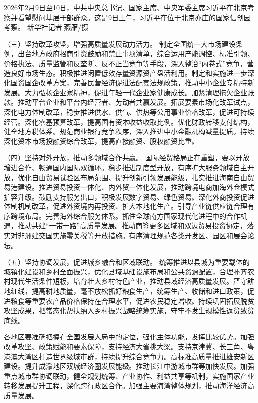 \documentclass[UTF8,zihao=-4]{ctexart}
\begin{document}
2026年2月9日至10日，中共中央总书记、国家主席、中央军委主席习近平在北京考察并看望慰问基层干部群众。这是9日上午，习近平在位于北京亦庄的国家信创园考察。 新华社记者 燕雁/摄

（三）坚持改革攻坚，增强高质量发展动力活力。 制定全国统一大市场建设条例，出台地方政府招商引资鼓励和禁止事项清单，综合运用产能调控、标准引领、价格执法、质量监管和反垄断、反不正当竞争等手段，深入整治“内卷式”竞争，营造良好市场生态。积极推进闲置低效存量资源资产盘活利用。制定和实施进一步深化国资国企改革方案，完善民营经济促进法配套法规政策，推动中小企业专精特新发展。大力弘扬企业家精神，促进年轻一代企业家健康成长。加紧清理拖欠企业账款。推动平台企业和平台内经营者、劳动者共赢发展。拓展要素市场化改革试点，深化电力体制改革，稳步推进供水、供气、供热等公用事业价格改革，促进可持续经营。深化零基预算改革，提高国有资本收益收取比例。优化财政转移支付结构，健全地方税体系。规范商业银行竞争秩序，深入推进中小金融机构减量提质。持续深化资本市场投融资综合改革，提高直接融资、股权融资比重。

（四）坚持对外开放，推动多领域合作共赢。 国际经贸格局正在重塑，要以开放增进合作、畅通国内国际双循环。稳步推进制度型开放，有序扩大服务领域自主开放，优化自由贸易试验区布局范围、提升创新引领发展能级，扎实推进海南自由贸易港建设。推进贸易投资一体化、内外贸一体化发展，推动跨境电商加海外仓模式扩容升级。鼓励支持服务出口，积极发展数字贸易、绿色贸易。深化外商投资促进体制机制改革，促进外资境内再投资、扩大本地化生产。引导产业链供应链合理有序跨境布局。完善海外综合服务体系。抓住全球南方国家现代化进程中的合作机遇，推动共建“一带一路”高质量发展。推动商签更多区域和双边贸易投资协定，落实对非洲建交国实施零关税等开放措施。有序清理规范各类开发区、园区和展会论坛。

（五）坚持协调发展，促进城乡融合和区域联动。 统筹推进以县城为重要载体的城镇化建设和乡村全面振兴，优化县域基础设施布局和公共资源配置，合理补齐农村现代生活条件短板，培育壮大乡村特色产业，推动县域经济高质量发展。严守耕地红线，提高耕地质量，毫不放松抓好粮食生产，统筹生产、收储和进口政策，促进粮食等重要农产品价格保持在合理水平，促进农民稳定增收。持续巩固拓展脱贫攻坚成果，把常态化帮扶纳入乡村振兴战略统筹实施，守牢不发生规模性返贫致贫底线。

各地区要准确把握在全国发展大局中的定位，强化主体功能，发挥比较优势。加强改革攻坚、政策赋能和要素保障，支持经济大省挑大梁。支持京津冀、长三角、粤港澳大湾区打造世界级城市群，持续提升综合竞争力。高标准高质量推进雄安新区建设。提升成渝地区双城经济圈发展能级。推动长江中游城市群等加快发展。加强重点城市群协调联动，健全规划统筹、产业协作、利益共享等机制，实施国家产业转移发展提升工程，深化跨行政区合作。加强主要海湾整体规划，推动海洋经济高质量发展。
\end{document}

